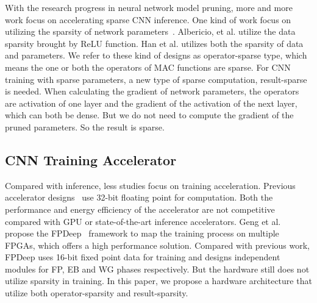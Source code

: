 With the research progress in neural network model pruning, more and more work focus on accelerating sparse CNN inference. One kind of work focus on utilizing the sparsity of network parameters~\cite{han2017ese,zhang2016cambricon}. Albericio, et al.\cite{albericio2016cnvlutin} utilize the data sparsity brought by ReLU function. Han et al. \cite{han2016eie} utilizes both the sparsity of data and parameters. We refer to these kind of designs as operator-sparse type, which means the one or both the operators of MAC functions are sparse. For CNN training with sparse parameters, a new type of sparse computation, result-sparse is needed. When calculating the gradient of network parameters, the operators are activation of one layer and the gradient of the activation of the next layer, which can both be dense. But we do not need to compute the gradient of the pruned parameters. So the result is sparse.

\subsection{CNN Training Accelerator}\label{sec:rw:train_acc}
Compared with inference, less studies focus on training acceleration. Previous accelerator designs~\cite{liu2017fpga, zhao2016f} use 32-bit floating point for computation. Both the performance and energy efficiency of the accelerator are not competitive compared with GPU or state-of-the-art inference accelerators. Geng et al. propose the FPDeep~\cite{geng2018fpdeep} framework to map the training process on multiple FPGAs, which offers a high performance solution. Compared with previous work, FPDeep uses 16-bit fixed point data for training and designs independent modules for FP, EB and WG phases respectively. But the hardware still does not utilize sparsity in training. In this paper, we propose a hardware architecture that utilize both operator-sparsity and result-sparsity.

